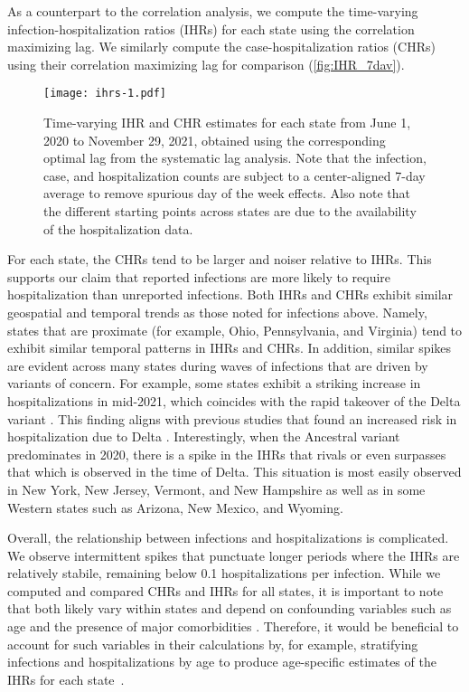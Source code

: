 As a counterpart to the correlation analysis, we compute the time-varying
infection-hospitalization ratios (IHRs) for each state using the correlation
maximizing lag. We similarly compute the case-hospitalization ratios (CHRs)
using their correlation maximizing lag for comparison
(\autoref{fig:IHR_7dav}). 

\begin{figure}[!tb]
\centering
\texttt{[image: ihrs-1.pdf]}
\caption{Time-varying IHR and CHR estimates for each state from June 1, 2020
to November 29, 2021, obtained using the corresponding optimal lag from the
systematic lag analysis. Note that the infection, case, and hospitalization
counts are subject to a center-aligned 7-day average to remove spurious day
of the week effects. Also note that the different starting points across
states are due to the availability of the hospitalization data.}
\label{fig:IHR_7dav}
\end{figure}
    

For each state, the CHRs tend to be larger and noiser relative to IHRs. This
supports our claim that reported infections are more likely to require
hospitalization than unreported infections. Both IHRs and CHRs exhibit similar
geospatial and temporal trends as those noted for infections above. Namely,
states that are proximate (for example, Ohio, Pennsylvania, and Virginia) tend
to exhibit similar temporal patterns in IHRs and CHRs. In addition, similar
spikes are evident across many states during waves of infections that are driven
by variants of concern. For example, some states exhibit a striking increase in
hospitalizations in mid-2021, which coincides with the rapid takeover of the
Delta variant \citep{hodcroft2021covariants}. This finding aligns with previous
studies that found an increased risk in hospitalization due to Delta
\citep{twohig2022hospital, nyberg2022comparative}. Interestingly, when the
Ancestral variant predominates in 2020, there is a spike in the IHRs that rivals
or even surpasses that which is observed in the time of Delta. This situation is
most easily observed in New York, New Jersey, Vermont, and New Hampshire as well
as in some Western states such as Arizona, New Mexico, and Wyoming.

Overall, the relationship between infections and hospitalizations is
complicated. We observe intermittent spikes that punctuate longer periods where
the IHRs are relatively stabile, remaining below 0.1 hospitalizations per
infection. While we computed and compared CHRs and IHRs for all states, it is
important to note that both likely vary within states and depend on confounding
variables such as age and the presence of major comorbidities
\citep{russell2023comorbidities}. Therefore, it would be beneficial to account
for such variables in their calculations by, for example, stratifying infections
and hospitalizations by age to produce age-specific estimates of the IHRs for
each state~\citep{fox2023disproportionate}.





